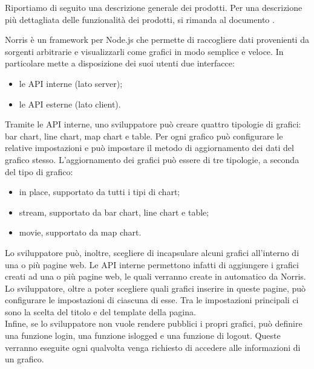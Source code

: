     Riportiamo di seguito una descrizione generale dei prodotti. Per una descrizione più dettagliata delle funzionalità dei prodotti, si rimanda al documento .

        Norris è un framework per Node.js che permette di raccogliere dati provenienti da sorgenti arbitrarie e visualizzarli come grafici in modo semplice e veloce. In particolare mette a disposizione dei suoi utenti due interfacce:
        \begin{itemize}
            \item le API interne (lato server);
            \item le API esterne (lato client).
        \end{itemize}
        
        Tramite le API interne, uno sviluppatore può creare quattro tipologie di grafici: bar chart, line chart, map chart e table. Per ogni grafico può configurare le relative impostazioni e può impostare il metodo di aggiornamento dei dati del grafico stesso. L'aggiornamento dei grafici può essere di tre tipologie, a seconda del tipo di grafico:
        \begin{itemize}
            \item in place, supportato da tutti i tipi di chart;
            \item stream, supportato da bar chart, line chart e table;
            \item movie, supportato da map chart.
        \end{itemize}
        
        
        
        Lo sviluppatore può, inoltre, scegliere di incapsulare alcuni grafici all'interno di una o più pagine web. Le API interne permettono infatti di aggiungere i grafici creati ad una o più pagine web, le quali verranno create in automatico da Norris. Lo sviluppatore, oltre a poter scegliere quali grafici inserire in queste pagine, può configurare le impostazioni di ciascuna di esse. Tra le impostazioni principali ci sono la scelta del titolo e del template della pagina.\\
        Infine, se lo sviluppatore non vuole rendere pubblici i propri grafici, può definire una funzione login, una funzione islogged e una funzione di logout. Queste verranno eseguite ogni qualvolta venga richiesto di accedere alle informazioni di un grafico.
       

